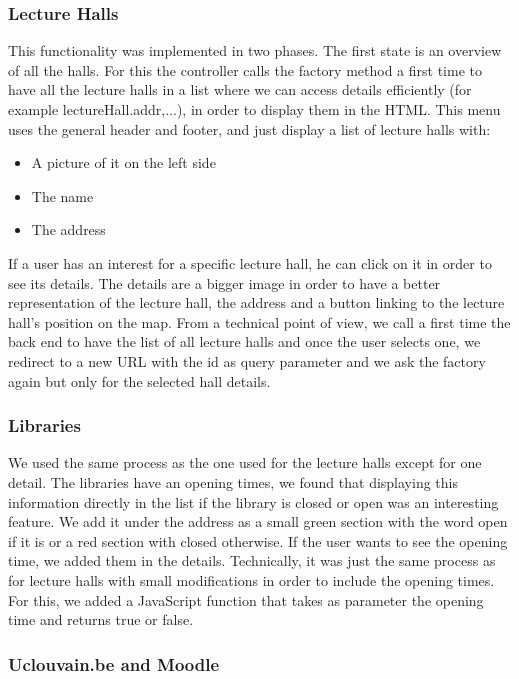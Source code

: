\documentclass{eplmastersthesis}
\begin{document}
\subsubsection{Lecture Halls}
This functionality was implemented in two phases. The first state is an overview of all the halls. For this the controller calls the factory method a first time to have all the lecture halls in a list where we can access details efficiently (for example lectureHall.addr,...), in order to display them in the HTML. This menu uses the general header and footer, and just display a list of lecture halls with:
\begin{itemize}
\item A picture of it on the left side
\item The name
\item The address
\end{itemize}
If a user has an interest for a specific lecture hall, he can click on it in order to see its details. The details are a bigger image in order to have a better representation of the lecture hall, the address and a button linking to the lecture hall's position on the map.
From a technical point of view, we call a first time the back end to have the list of all lecture halls and once the user selects one, we redirect to a new URL with the id as query parameter and we ask the factory again but only for the selected hall details.

\subsubsection{Libraries}
We used the same process as the one used for the lecture halls except for one detail. The libraries have an opening times, we found that displaying this information directly in the list if the library is closed or open was an interesting feature. We add it under the address as a small green section with the word open if it is or a red section with closed otherwise. If the user wants to see the opening time, we added them in the details. 
Technically, it was just the same process as for lecture halls with small modifications in order to include the opening times. For this, we added a JavaScript function that takes as parameter the opening time and returns true or false.

\subsubsection{Uclouvain.be and Moodle}
\end{document}
